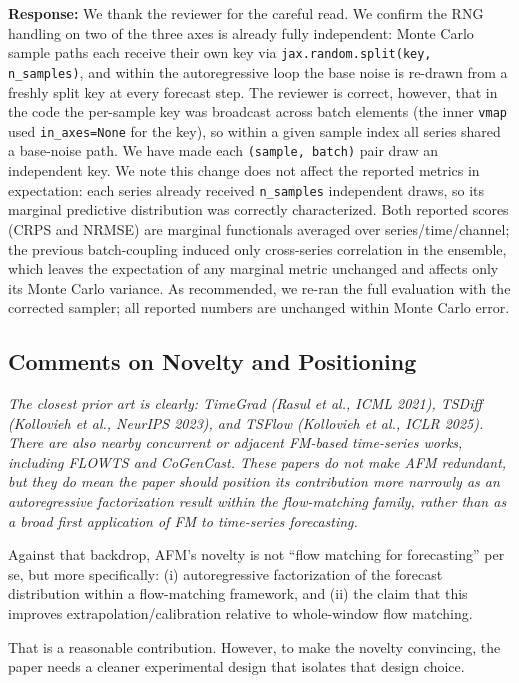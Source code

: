 \documentclass[11pt]{article}
\newcommand{\reviewertext}[1]{%
  \begin{reviewerquote}
    {\color{reviewercolor}\itshape #1}
  \end{reviewerquote}%
}
\newcommand{\authorresponse}[1]{%
  \textbf{Response:} #1\par\medskip
}
\begin{document}
\authorresponse{%
We thank the reviewer for the careful read. We confirm the RNG handling on two of the three axes is already fully independent: Monte Carlo sample paths each receive their own key via \texttt{jax.random.split(key, n\_samples)}, and within the autoregressive loop the base noise is re-drawn from a freshly split key at every forecast step. The reviewer is correct, however, that in the code the per-sample key was broadcast across batch elements (the inner \texttt{vmap} used \texttt{in\_axes=None} for the key), so within a given sample index all series shared a base-noise path.
 We have made each \texttt{(sample, batch)} pair draw an independent key. We note this change does not affect the reported metrics in expectation: each series already received \texttt{n\_samples} independent draws, so its marginal predictive distribution was correctly characterized. Both reported scores (CRPS and NRMSE) are marginal functionals averaged over series/time/channel; the previous batch-coupling induced only cross-series correlation in the ensemble, which leaves the expectation of any marginal metric unchanged and affects only its Monte Carlo variance. As recommended, we re-ran the full evaluation with the corrected sampler; all reported numbers are unchanged within Monte Carlo error.
}

\subsection{Comments on Novelty and Positioning}

\reviewertext{%
The closest prior art is clearly: TimeGrad (Rasul et al., ICML 2021), TSDiff (Kollovieh et al., NeurIPS 2023), and TSFlow (Kollovieh et al., ICLR 2025). There are also nearby concurrent or adjacent FM-based time-series works, including FLOWTS and CoGenCast. These papers do not make AFM redundant, but they do mean the paper should position its contribution more narrowly as an autoregressive factorization result within the flow-matching family, rather than as a broad first application of FM to time-series forecasting.

Against that backdrop, AFM's novelty is not ``flow matching for forecasting'' per se, but more specifically: (i) autoregressive factorization of the forecast distribution within a flow-matching framework, and (ii) the claim that this improves extrapolation/calibration relative to whole-window flow matching.

That is a reasonable contribution. However, to make the novelty convincing, the paper needs a cleaner experimental design that isolates that design choice.
}
\end{document}
